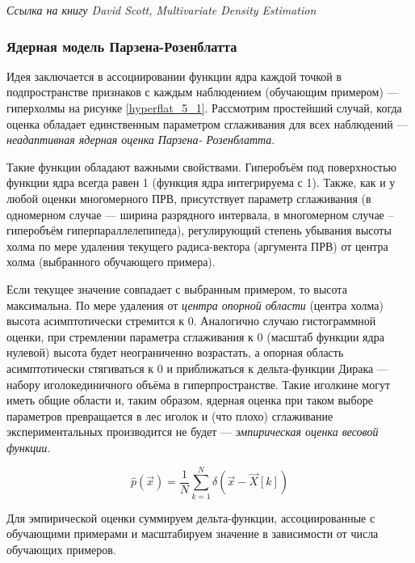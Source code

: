 \documentclass{article}
\numberwithin{equation}{subsection}
\begin{document}
\begin{myquote}
    \textit{Ссылка на книгу David Scott, Multivariate Density Estimation}
\end{myquote}




\subsubsection{Ядерная модель Парзена-Розенблатта}

Идея заключается в ассоциировании функции ядра каждой точкой в подпространстве 
признаков с каждым наблюдением (обучающим примером) --- \glqq гиперхолмы\grqq 
на рисунке \ref{hyperflat_5_1}.
Рассмотрим простейший случай, когда оценка обладает единственным параметром 
сглаживания для всех наблюдений --- \textit{неадаптивная ядерная оценка Парзена-
Розенблатта}.

Такие функции обладают важными свойствами.
Гиперобъём под поверхностью функции ядра всегда равен 1 (функция ядра интегрируема с 1).
Также, как и у любой оценки многомерного ПРВ, присутствует параметр сглаживания
(в одномерном случае --- ширина разрядного интервала,
в многомерном случае -- гиперобъём гиперпараллелепипеда), регулирующий степень 
убывания высоты холма по мере удаления текущего радиса-вектора (аргумента ПРВ)
от центра холма (выбранного обучающего примера). 

Если текущее значение совпадает с выбранным примером, то высота максимальна. 
По мере удаления от \textit{центра опорной области} (центра холма) высота асимптотически
стремится к $0$. Аналогично случаю гистограммной оценки, при стремлении параметра 
сглаживания к 0 (масштаб функции ядра нулевой) высота будет неограниченно возрастать,
а опорная область асимптотически стягиваться к 0 и приближаться к дельта-функции 
Дирака --- набору \glqq иголок\grqq единичного объёма в гиперпространстве.
Такие \glqq иголки\grqq не могут иметь общие области и, таким образом, 
ядерная оценка при таком выборе параметров превращается в \glqq лес иголок\grqq 
и (что плохо) сглаживание экспериментальных производится не будет
 --- \textit{эмпирическая оценка весовой функции}.

\begin{equation}
    \hat{p}(\vec{x}) = \dfrac{1}{N} \sum_{k=1}^{N} \delta(\vec{x} - \vec{X}[k])
    \label{eq:empirical_weight_func}
\end{equation}

Для эмпирической оценки суммируем дельта-функции, ассоциированные с обучающими примерами
и масштабируем значение в зависимости от числа обучающих примеров.
\end{document}
